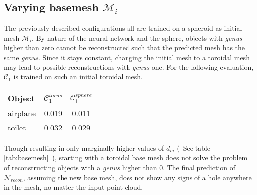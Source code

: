 \subsection{Varying basemesh $\mathcal{M}_i$}
    The previously described configurations all are trained on a spheroid as initial mesh $\mathcal{M}_i$. 
    By nature of the neural network and the sphere, objects with \emph{genus} higher than zero cannot be
    reconstructed such that the predicted mesh has the same \emph{genus}. Since it stays constant, 
    changing the initial mesh to a toroidal mesh may lead to possible reconstructions with \emph{genus} one. 
    For the following evaluation, $\mathcal{C}_{1}$ is trained on such an initial toroidal mesh.

\begin{center}
     \label{tab:basemesh} 
    \begin{center}
        \begin{tabular}{| l  | c | c |}
            \hline
            Object& $\mathcal{C}_1^{torus}$ & $\mathcal{C}_1^{sphere}$ \\ \hline
            airplane&0.019&0.011\\\hline
            toilet&0.032&0.029\\\hline
        \end{tabular}
    \end{center}
\end{center}
    Though resulting in only marginally higher values of $d_m$ (~See table \ref{tab:basemesh}~), starting with a toroidal base mesh does not solve the problem 
    of reconstructing objects with a \emph{genus} higher than 0. The final prediction of $\mathcal{N}_{recon}$, assuming the 
    new base mesh, does not show any signs of a hole anywhere in the mesh, no matter the input point cloud. 

